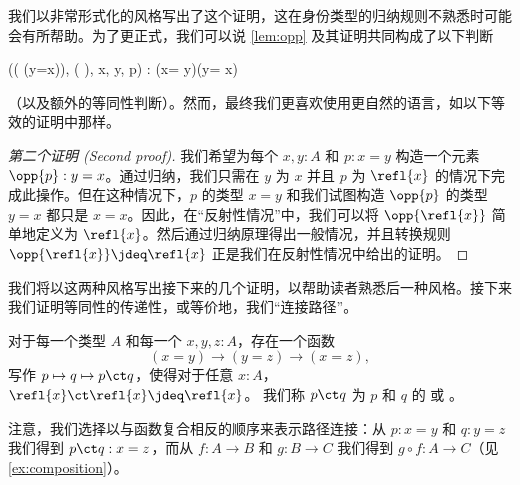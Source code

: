 我们以非常形式化的风格写出了这个证明，这在身份类型的归纳规则不熟悉时可能会有所帮助。为了更正式，我们可以说 \cref{lem:opp} 及其证明共同构成了以下判断
\begin{narrowmultline*}
   (( (y=x)), ( ), x, y, p)
  \narrowbreak :  (x= y)\to(y= x)
\end{narrowmultline*}
（以及额外的等同性判断）。然而，最终我们更喜欢使用更自然的语言，如以下等效的证明中那样。

\begin{proof}[第二个证明 (Second proof)]
  我们希望为每个 $x,y:A$ 和 $p:x=y$ 构造一个元素 $\opp{p}:y=x$。通过归纳，我们只需在 $y$ 为 $x$ 并且 $p$ 为 $\refl{x}$ 的情况下完成此操作。但在这种情况下，$p$ 的类型 $x=y$ 和我们试图构造 $\opp{p}$ 的类型 $y=x$ 都只是 $x=x$。因此，在“反射性情况”中，我们可以将 $\opp{\refl{x}}$ 简单地定义为 $\refl{x}$。然后通过归纳原理得出一般情况，并且转换规则 $\opp{\refl{x}}\jdeq\refl{x}$ 正是我们在反射性情况中给出的证明。
\end{proof}

我们将以这两种风格写出接下来的几个证明，以帮助读者熟悉后一种风格。接下来我们证明等同性的传递性，或等价地，我们“连接路径”。

\begin{lem}\label{lem:concat}
对于每一个类型 $A$ 和每一个 $x,y,z:A$，存在一个函数
\begin{equation*}
(x= y) \to   (y= z)\to (x=  z),
\end{equation*}
写作 $p \mapsto q \mapsto p\ct q$，使得对于任意 $x:A$，$\refl{x}\ct \refl{x}\jdeq \refl{x}$。
我们称 $p\ct q$ 为 $p$ 和 $q$ 的  或 。
%
%
%
%
%
%
\end{lem}

注意，我们选择以与函数复合相反的顺序来表示路径连接：从 $p:x=y$ 和 $q:y=z$ 我们得到 $p\ct q : x=z$，而从 $f:A\to B$ 和 $g:B\to C$ 我们得到 $g\circ f : A\to C$（见 \cref{ex:composition}）。

